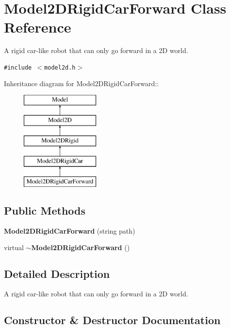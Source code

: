 \section{Model2DRigid\-Car\-Forward  Class Reference}
\label{classModel2DRigidCarForward}
A rigid car-like robot that can only go forward in a 2D world. 


{\tt \#include $<$model2d.h$>$}

Inheritance diagram for Model2DRigid\-Car\-Forward::\begin{figure}[H]
\begin{center}
\leavevmode
\includegraphics[height=5cm]{classModel2DRigidCarForward}
\end{center}
\end{figure}
\subsection*{Public Methods}
\begin{CompactItemize}
\item 
{\bf Model2DRigid\-Car\-Forward} (string path)
\item 
virtual {\bf $\sim$Model2DRigid\-Car\-Forward} ()
\end{CompactItemize}


\subsection{Detailed Description}
A rigid car-like robot that can only go forward in a 2D world.



\subsection{Constructor \& Destructor Documentation}
